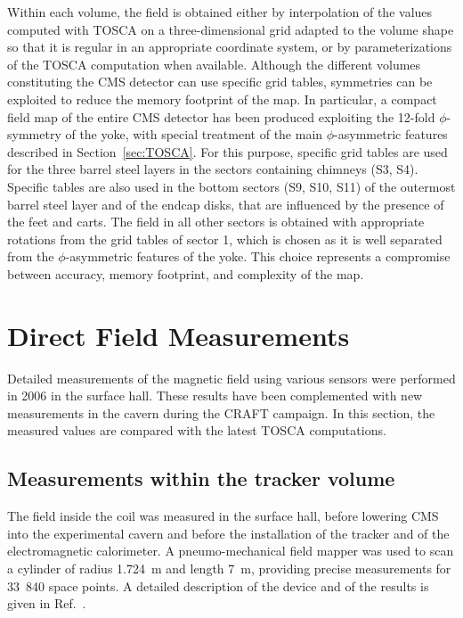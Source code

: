 Within each volume, the field is obtained either by interpolation of
the values computed with TOSCA on a three-dimen\-sional grid adapted to the
volume shape so that it is regular in an appropriate coordinate system,
or by parameterizations of the TOSCA computation when available.
Although the different volumes constituting the CMS detector can use
specific grid tables, symmetries can be exploited to reduce the memory
footprint of the map.
In particular, a compact field map of the entire CMS
detector has been produced exploiting the 12-fold $\phi$-symmetry of
the yoke, with special treatment of the main $\phi$-asymmetric features
described in Section~\ref{sec:TOSCA}.
For this purpose, specific grid tables are used for the three barrel
steel layers in the sectors containing chimneys (S3, S4).
Specific tables are also used in the bottom sectors (S9, S10, S11) of
the outermost barrel steel layer and of the endcap disks,  that are
influenced by the presence of the feet and carts.
The field in all other sectors is obtained with appropriate
rotations from the grid tables of sector 1, which is chosen as it is
well separated from the $\phi$-asymmetric features of the yoke.
This choice represents a compromise between accuracy, memory footprint,
and complexity of the map.



\section{Direct Field Measurements}
\label{sec:probes}

Detailed measurements of the magnetic field using various sensors were
performed in 2006 in the surface hall.
These results
have been complemented with new measurements in the cavern during
the CRAFT campaign. In this section, the measured values are compared
with the latest TOSCA computations.

\subsection{Measurements within the tracker volume}
\label{sec:mapping}
The field inside the coil was measured in the surface hall, before
lowering CMS into the experimental cavern and before the installation
of the tracker and of the electromagnetic calorimeter. A pneumo-mechanical field mapper was used to scan a
cylinder of radius 1.724~m and length 7~m, providing precise
measurements for \mbox{33\ 840} space points. A
detailed description of the device and of the results is given
in Ref.~\cite{CERN:040}.

